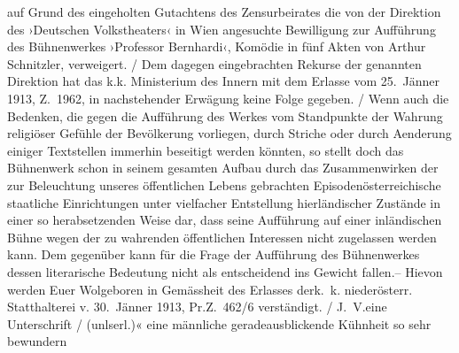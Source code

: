 {{{                        auf Grund des eingeholten Gutachtens des Zensurbeirates die von der Direktion des ›Deutschen Volkstheaters‹ in Wien angesuchte Bewilligung zur Aufführung des
                        Bühnenwerkes ›Professor Bernhardi‹,
                        Komödie in fünf Akten von Arthur Schnitzler, verweigert.{ / }Dem dagegen eingebrachten Rekurse der genannten Direktion hat das k.k. Ministerium des Innern mit dem Erlasse vom
                           25. Jänner 1913, Z. 1962, in nachstehender Erwägung keine
                        Folge gegeben.{ / }{\pb}Wenn auch die Bedenken, die gegen die Aufführung
                        des Werkes vom
                        Standpunkte der Wahrung religiöser Gefühle der Bevölkerung vorliegen, durch
                        Striche oder durch Aenderung einiger Textstellen immerhin beseitigt werden
                        könnten, so stellt doch das Bühnenwerk schon in seinem gesamten Aufbau durch
                        das Zusammenwirken der zur Beleuchtung unseres öffentlichen Lebens
                        gebrachten Episodenösterreichische
                        staatliche Einrichtungen unter vielfacher Entstellung hierländischer
                        Zustände in einer so herabsetzenden Weise dar, dass seine Aufführung auf
                        einer inländischen Bühne wegen der zu wahrenden öffentlichen Interessen
                        nicht zugelassen werden kann. Dem gegenüber kann für die Frage der
                        Aufführung des Bühnenwerkes dessen
                        literarische Bedeutung nicht als entscheidend ins Gewicht fallen.– Hievon
                        werden Euer Wolgeboren in Gemässheit des Erlasses derk. k. niederösterr. Statthalterei v.
                           30. Jänner 1913, Pr.Z. 462/6 verständigt.{ / }J. V.eine Unterschrift{ / }(unlserl.)«}}}\label{K_L03641-1} eine männliche geradeausblickende Kühnheit so sehr bewundern
